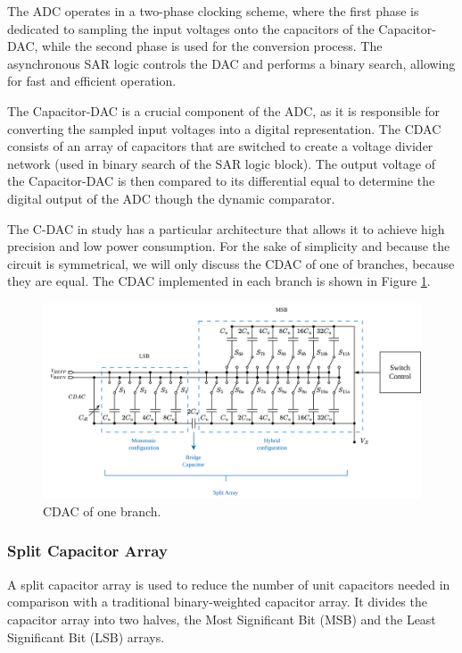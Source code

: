 The ADC operates in a two-phase clocking scheme, where the first phase is dedicated to sampling the input voltages onto the capacitors of the Capacitor-DAC, while the second phase is used for the conversion process. The asynchronous SAR logic controls the DAC and performs a binary search, allowing for fast and efficient operation.

The Capacitor-DAC is a crucial component of the ADC, as it is responsible for converting the sampled input voltages into a digital representation. The CDAC consists of an array of capacitors that are switched to create a voltage divider network (used in binary search of the SAR logic block). The output voltage of the Capacitor-DAC is then compared to its differential equal to determine the digital output of the ADC though the dynamic comparator.

The C-DAC in study has a particular architecture that allows it to achieve high precision and low power consumption. 
For the sake of simplicity and because the circuit is symmetrical, we will only discuss the CDAC of one of branches, because they are equal. The CDAC implemented in each branch is shown in Figure \ref{fig:CDAC-sch}. 

\begin{figure}[h]
    \centering
    \includegraphics[width=1\textwidth]{Images/CDAC-sch.png}
    \caption{CDAC of one branch.}
    \label{fig:CDAC-sch}
\end{figure}

\subsubsection{Split Capacitor Array}

A split capacitor array is used to reduce the number of unit capacitors needed in comparison with a traditional binary-weighted capacitor array. It divides the capacitor array into two halves, the Most Significant Bit (MSB) and the Least Significant Bit (LSB) arrays. 

